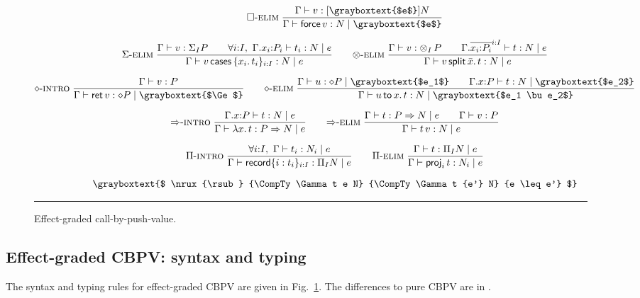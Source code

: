 \documentclass[acmsmall,review,anonymous]{acmart}\settopmatter{printfolios=true,printccs=false,printacmref=false}
\newcommand{\graybox}[1]{\grayboxtext{$#1$}}
\begin{document}
\begin{figure}[htbp]
\begin{gather*}
\qquad
 \nru{\relim\Box}
     {\ValTy \Gamma v {\thunkty {\graybox e} N}
    }{\CompTy \Gamma {\force v} {\graybox e} N}
\\[1.5ex]
 \nru{\relim\GS}
     {\ValTy \Gamma v {\sumt I P} \qquad
      \forall i{:}I,\ \CompTy {\ext \Gamma {x_i} {P_i}} {t_i} e N
    }{\CompTy \Gamma {\caser v {\{x_i.\, t_i\}_{i:I}}} e N}
\qquad
 \nru{\relim\otimes}
     {\ValTy \Gamma v {\tupt I P} \qquad
      \CompTy {\extr \Gamma {\overline{x_i{:}P_i}^{i:I}}} t e N
    }{\CompTy \Gamma {\splits v {\bar x} t} e N}
\\[1.5ex]
 \nru{\rintro\diamond}
     {\ValTy \Gamma v P
    }{\CompTy \Gamma {\ret v} {\graybox \Ge} {\diamond P}}
\qquad
 \nru{\relim\diamond}
     {\CompTy \Gamma u {\graybox{e_1}} {\diamond P} \qquad
      \CompTy {\ext \Gamma x P} t {\graybox{e_2}} N
    }{\CompTy \Gamma {\bind x u t} {\graybox{e_1 \bu e_2}} N}
\\[1.5ex]
 \nru{\rintro\To}
     {\CompTy {\ext \Gamma x P} t e N
    }{\CompTy \Gamma {\lam x t} e {P \To N}}
\qquad
 \nru{\relim\To}
     {\CompTy \Gamma t e {P \To N} \qquad
      \ValTy \Gamma v P
    }{\CompTy \Gamma {\app t v} e N}
\\[1.5ex]
 \nru{\rintro\Pi}
     {\forall i{:}I,\ \CompTy \Gamma {t_i} e {N_i}
    }{\CompTy \Gamma {\trecord {\{i : t_i\}_{i:I}}} e {\rect I N}}
\qquad
 \nru{\relim\Pi}
     {\CompTy \Gamma t e {\rect I N}
    }{\CompTy \Gamma {\proj i t} e  {N_i}}
\\[1.5ex]
\graybox{
 \nrux{\rsub}
      {\CompTy \Gamma t e N}
      {\CompTy \Gamma t {e'} N}
      {e \leq e'}
}
\end{gather*}
\rule{\textwidth}{0.2pt}
  \caption{Effect-graded call-by-push-value.}
  \label{fig:cbpv}
\end{figure}

\subsection{Effect-graded CBPV: syntax and typing}
\label{sec:effect-cbpv}

The syntax and typing rules for effect-graded CBPV are given in
Fig.~\ref{fig:cbpv}.  The differences to pure CBPV are in
\graybox{\mbox{gray boxes}}.
\end{document}
